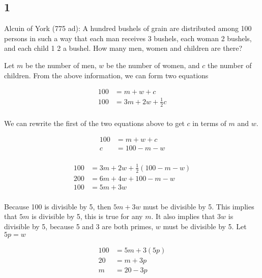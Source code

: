 \documentclass[12pt]{article} %
\begin{document}
\pagebreak

\begin{homeworkProblem}
    \subsection*{1}
    \begin{grayBoxed}
        Alcuin of York (775 ad): A hundred bushels of grain are distributed
        among 100 persons in such a way that each man receives 3 bushels, each
        woman 2 bushels, and each child 1
        2 a bushel. How many men, women and children
        are there?
    \end{grayBoxed}

    Let $m$ be the number of men, $w$ be the number of women, and $c$ the number of children.
    From the above information, we can form two equations

    \begin{align*}
        100 & = m + w + c               \\
        100 & = 3m + 2w + \frac{1}{2} c \\
    \end{align*}

    We can rewrite the first of the two equations above to get $c$ in terms of $m$ and $w$.

    \begin{align*}
        100 & = m + w + c   \\
        c   & = 100 - m - w \\
    \end{align*}

    \begin{align*}
        100 & = 3m + 2w + \frac{1}{2} (100 - m - w) \\
        200 & = 6m + 4w + 100 - m - w               \\
        100 & = 5m + 3w                             \\
    \end{align*}

    Because 100 is divisible by 5, then $5m + 3w$ must be divisible by 5. This implies that $5m$ is divisible
    by 5, this is true for any $m$. It also implies that $3w$ is divisible by 5, because 5 and 3 are both primes, $w$ must
    be divisible by 5. Let $5p = w$

    \begin{align*}
        100 & = 5m + 3(5p) \\
        20  & = m + 3p     \\
        m   & = 20 - 3p    \\
    \end{align*}


\end{homeworkProblem}
\end{document}
